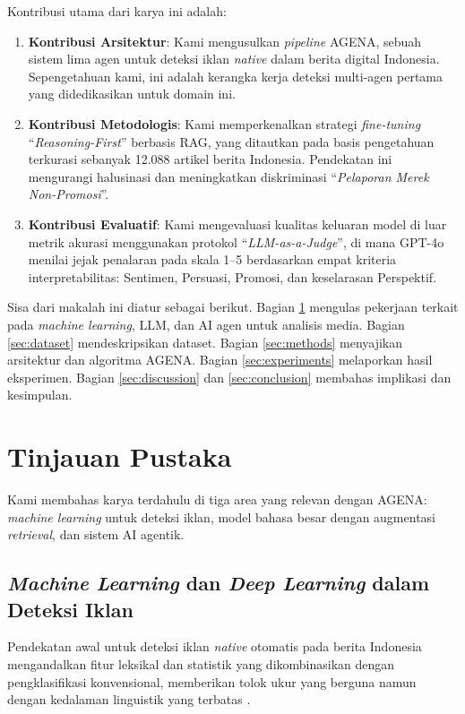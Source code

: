 \documentclass{ieeeaccess}
\begin{document}
Kontribusi utama dari karya ini adalah:
\begin{enumerate}
    \item \textbf{Kontribusi Arsitektur}: Kami mengusulkan \textit{pipeline} AGENA, sebuah sistem lima agen untuk deteksi iklan \textit{native} dalam berita digital Indonesia. Sepengetahuan kami, ini adalah kerangka kerja deteksi multi-agen pertama yang didedikasikan untuk domain ini.
    \item \textbf{Kontribusi Metodologis}: Kami memperkenalkan strategi \textit{fine-tuning} ``\textit{Reasoning-First}'' berbasis RAG, yang ditautkan pada basis pengetahuan terkurasi sebanyak 12.088 artikel berita Indonesia. Pendekatan ini mengurangi halusinasi dan meningkatkan diskriminasi ``\textit{Pelaporan Merek Non-Promosi}''.
    \item \textbf{Kontribusi Evaluatif}: Kami mengevaluasi kualitas keluaran model di luar metrik akurasi menggunakan protokol ``\textit{LLM-as-a-Judge}'', di mana GPT-4o menilai jejak penalaran pada skala 1--5 berdasarkan empat kriteria interpretabilitas: Sentimen, Persuasi, Promosi, dan keselarasan Perspektif.
\end{enumerate}

Sisa dari makalah ini diatur sebagai berikut. Bagian \ref{sec:related-works} mengulas pekerjaan terkait pada \textit{machine learning}, LLM, dan AI agen untuk analisis media. Bagian \ref{sec:dataset} mendeskripsikan dataset. Bagian \ref{sec:methods} menyajikan arsitektur dan algoritma AGENA. Bagian \ref{sec:experiments} melaporkan hasil eksperimen. Bagian \ref{sec:discussion} dan \ref{sec:conclusion} membahas implikasi dan kesimpulan.

\section{Tinjauan Pustaka}
\label{sec:related-works}
Kami membahas karya terdahulu di tiga area yang relevan dengan AGENA: \textit{machine learning} untuk deteksi iklan, model bahasa besar dengan augmentasi \textit{retrieval}, dan sistem AI agentik.

\subsection{\textit{Machine Learning} dan \textit{Deep Learning} dalam Deteksi Iklan}
Pendekatan awal untuk deteksi iklan \textit{native} otomatis pada berita Indonesia mengandalkan fitur leksikal dan statistik yang dikombinasikan dengan pengklasifikasi konvensional, memberikan tolok ukur yang berguna namun dengan kedalaman linguistik yang terbatas \cite{b18, b21}.
\end{document}
